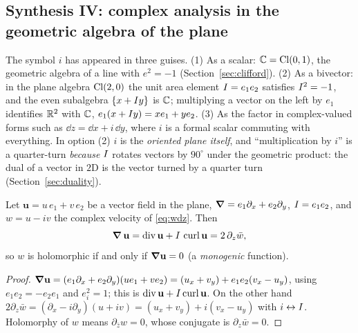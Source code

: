 \subsection{Synthesis IV: complex analysis in the geometric algebra of the plane}\label{sec:synth4}

\begin{synthesis}
The symbol $i$ has appeared in three guises. (1) As a scalar: $\mathbb{C}=\mathrm{Cl}(0,1)$, the geometric algebra of a line with $e^2=-1$ (Section~\ref{sec:clifford}). (2) As a bivector: in the plane algebra $\mathrm{Cl}(2,0)$ the unit area element $I=e_1e_2$ satisfies $I^2=-1$, and the even subalgebra $\{x+I y\}$ is $\mathbb{C}$; multiplying a vector on the left by $e_1$ identifies $\mathbb{R}^2$ with $\mathbb{C}$, $e_1(x+I y)=xe_1+ye_2$. (3) As the factor in complex-valued forms such as $\dd z=\dd x+i\,\dd y$, where $i$ is a formal scalar commuting with everything.
In option (2) $i$ is the \emph{oriented plane itself}, and ``multiplication by $i$'' is a quarter-turn \emph{because} $I$ rotates vectors by $90^\circ$ under the geometric product: the dual of a vector in $2$D is the vector turned by a quarter turn (Section~\ref{sec:duality}).
\end{synthesis}

\begin{proposition}\label{prop:CRga}
Let $\mathbf u=u\,e_1+v\,e_2$ be a vector field in the plane, $\boldsymbol{\nabla}=e_1\partial_x+e_2\partial_y$, $I=e_1e_2$, and $w=u-iv$ the complex velocity of \eqref{eq:wdz}. Then
\[
\boldsymbol{\nabla}\,\mathbf u=\operatorname{div}\mathbf u+I\,\operatorname{curl}\mathbf u=2\,\partial_z\bar w,
\]
so $w$ is holomorphic if and only if $\boldsymbol{\nabla}\mathbf u=0$ (a \emph{monogenic} function).
\end{proposition}
\begin{proof}
$\boldsymbol{\nabla}\mathbf u=(e_1\partial_x+e_2\partial_y)(ue_1+ve_2)=(u_x+v_y)+e_1e_2(v_x-u_y)$, using $e_1e_2=-e_2e_1$ and $e_i^2=1$; this is $\operatorname{div}\mathbf u+I\operatorname{curl}\mathbf u$. On the other hand $2\partial_z\bar w=(\partial_x-i\partial_y)(u+iv)=(u_x+v_y)+i(v_x-u_y)$ with $i\leftrightarrow I$. Holomorphy of $w$ means $\partial_{\bar z}w=0$, whose conjugate is $\partial_z\bar w=0$.
\end{proof}

